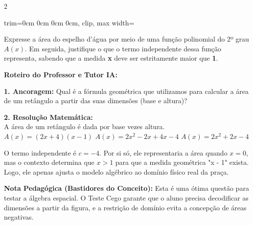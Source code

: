 \begin{multicols*}{2}
\begin{enunciadoLiteral}
\begin{center}
\begin{adjustbox}{trim=0cm 0cm 0cm 0cm, clip, max width=\larguraTikz}
\end{adjustbox}
\end{center}

Expresse a área do espelho d'água por meio de uma função polinomial do 2º grau $A(x)$. Em seguida, justifique o que o termo independente dessa função representa, sabendo que a medida \textbf{x} deve ser estritamente maior que \textbf{1}.
\end{enunciadoLiteral}

\ifgabarito
    \begin{tcolorbox}[colback=CorTitUm!5, colframe=CorTitUm, boxrule=1pt, arc=4pt, left=6pt, right=6pt, top=6pt, bottom=6pt]
    \small\textbf{\textcolor{CorTitUm}{Roteiro do Professor e Tutor IA:}}\par\vspace{0.1cm}
    \color{CinzaEscuro}
    \textbf{1. Ancoragem:} Qual é a fórmula geométrica que utilizamos para calcular a área de um retângulo a partir das suas dimensões (base e altura)?\par\vspace{0.1cm}
    \textbf{2. Resolução Matemática:}\\
    A área de um retângulo é dada por base vezes altura.
    $A(x) = (2x + 4)(x - 1)$
    $A(x) = 2x^2 - 2x + 4x - 4$
    $A(x) = 2x^2 + 2x - 4$
    
    O termo independente é $c = -4$. Por si só, ele representaria a área quando $x=0$, mas o contexto determina que $x > 1$ para que a medida geométrica "x - 1" exista. Logo, ele apenas ajusta o modelo algébrico ao domínio físico real da praça.
    \end{tcolorbox}
    \vspace{0.15cm}
    
    \begin{boxexplicacao}
    \textbf{Nota Pedagógica (Bastidores do Conceito):} Esta é uma ótima questão para testar a álgebra espacial. O Teste Cego garante que o aluno precisa decodificar as dimensões a partir da figura, e a restrição de domínio evita a concepção de áreas negativas.
    \end{boxexplicacao}
\fi

\par\vspace{\espacoQuestao}


\end{multicols*}

